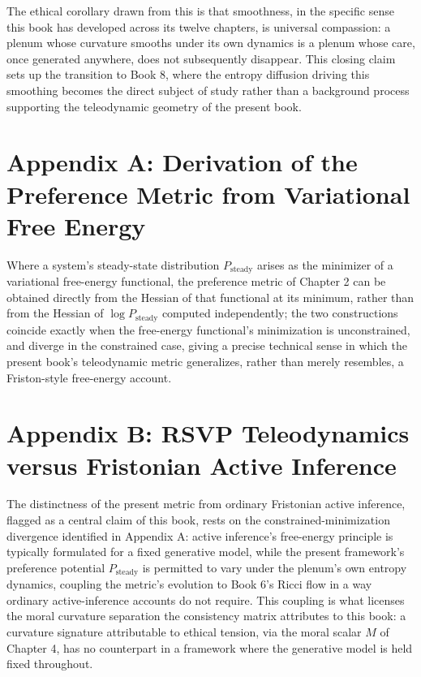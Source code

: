The ethical corollary drawn from this is that smoothness, in the specific sense this book has developed across its twelve chapters, is universal compassion: a plenum whose curvature smooths under its own dynamics is a plenum whose care, once generated anywhere, does not subsequently disappear. This closing claim sets up the transition to Book 8, where the entropy diffusion driving this smoothing becomes the direct subject of study rather than a background process supporting the teleodynamic geometry of the present book.

\chapter*{Appendix A: Derivation of the Preference Metric from Variational Free Energy}

Where a system's steady-state distribution $P_{\text{steady}}$ arises as the minimizer of a variational free-energy functional, the preference metric of Chapter 2 can be obtained directly from the Hessian of that functional at its minimum, rather than from the Hessian of $\log P_{\text{steady}}$ computed independently; the two constructions coincide exactly when the free-energy functional's minimization is unconstrained, and diverge in the constrained case, giving a precise technical sense in which the present book's teleodynamic metric generalizes, rather than merely resembles, a Friston-style free-energy account.

\chapter*{Appendix B: RSVP Teleodynamics versus Fristonian Active Inference}

The distinctness of the present metric from ordinary Fristonian active inference, flagged as a central claim of this book, rests on the constrained-minimization divergence identified in Appendix A: active inference's free-energy principle is typically formulated for a fixed generative model, while the present framework's preference potential $P_{\text{steady}}$ is permitted to vary under the plenum's own entropy dynamics, coupling the metric's evolution to Book 6's Ricci flow in a way ordinary active-inference accounts do not require. This coupling is what licenses the moral curvature separation the consistency matrix attributes to this book: a curvature signature attributable to ethical tension, via the moral scalar $M$ of Chapter 4, has no counterpart in a framework where the generative model is held fixed throughout.

